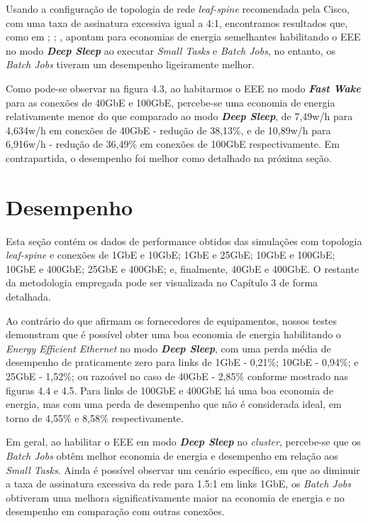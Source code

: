 Usando a configuração de topologia de rede \emph{leaf-spine} recomendada pela Cisco, com uma taxa de assinatura excessiva igual a 4:1, encontramos resultados que, como em \cite{silva2018eon}; \cite{e2015exploring}; \cite{e2017energy}, apontam para economias de energia semelhantes habilitando o EEE no modo \textbf{\emph{Deep Sleep}} ao executar \emph{Small Tasks} e \emph{Batch Jobs}, no entanto, os \emph{Batch Jobs} tiveram um desempenho ligeiramente melhor.

Como pode-se observar na figura 4.3, ao habitarmos o EEE no modo \textbf{\emph{Fast Wake}} para as conexões de 40GbE e 100GbE, percebe-se uma economia de energia relativamente menor do que comparado ao modo \textbf{\emph{Deep Sleep}}, de 7,49w/h para 4,634w/h em conexões de 40GbE - redução de 38,13\%, e de 10,89w/h para 6,916w/h - redução de 36,49\% em conexões de 100GbE respectivamente. Em contrapartida, o desempenho foi melhor como detalhado na próxima seção.

\section{Desempenho}

Esta seção contém os dados de performance obtidos das simulações com topologia \emph{leaf-spine} e conexões de 1GbE e 10GbE; 1GbE e 25GbE; 10GbE e 100GbE; 10GbE e 400GbE; 25GbE e 400GbE; e, finalmente, 40GbE e 400GbE. O restante da metodologia empregada pode ser visualizada no Capítulo 3 de forma detalhada.

Ao contrário do que afirmam os fornecedores de equipamentos, nossos testes demonstram que é possível obter uma boa economia de energia habilitando o \emph{Energy Efficient Ethernet} no modo \textbf{\emph{Deep Sleep}}, com uma perda média de desempenho de praticamente zero para links de 1GbE - 0,21\%; 10GbE - 0,94\%; e 25GbE - 1,52\%; ou razoável no caso de 40GbE - 2,85\% conforme mostrado nas figuras 4.4 e 4.5. Para links de 100GbE e 400GbE há uma boa economia de energia, mas com uma perda de desempenho que não é considerada ideal, em torno de 4,55\% e 8,58\% respectivamente.

Em geral, ao habilitar o EEE em modo \textbf{\emph{Deep Sleep}} no \emph{cluster}, percebe-se que os \emph{Batch Jobs} obtêm melhor economia de energia e desempenho em relação aos \emph{Small Tasks}. Ainda é possível observar um cenário específico, em que ao diminuir a taxa de assinatura excessiva da rede para 1.5:1 em links 1GbE, os \emph{Batch Jobs} obtiveram uma melhora significativamente maior na economia de energia e no desempenho em comparação com outras conexões.


